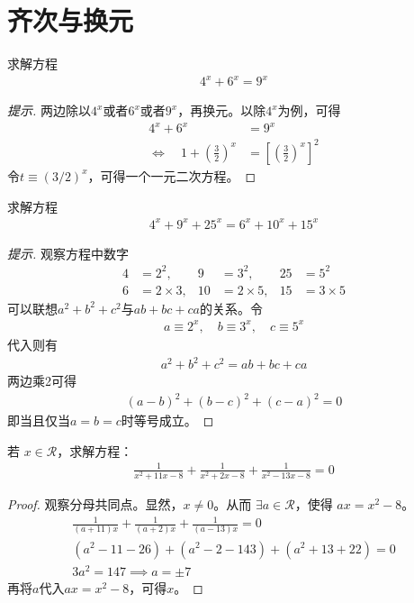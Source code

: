 \section{齐次与换元}
\label{sec:homogeneous-and-substitution}

\begin{example}[美国竞赛题]
  求解方程
  \begin{align*}
    4^x + 6^x = 9^x
  \end{align*}
\end{example}
\begin{proof}[提示]
  两边除以$4^x$或者$6^x$或者$9^x$，再换元。以除$4^x$为例，可得
  \begin{align*}
                               4^x + 6^x &= 9^x\\
    \iff\quad 1 + \left(\frac32\right)^x &= \left[\left(\frac32\right)^x\right]^2
  \end{align*}
  令$t\equiv (3/2)^x$，可得一个一元二次方程。
\end{proof}


\begin{example}[安徽竞赛题]
  求解方程
  \begin{align*}
    4^x + 9^x + 25^x = 6^x + 10^x + 15^x
  \end{align*}
\end{example}
\begin{proof}[提示]
  观察方程中数字
  \begin{align*}
    4 &= 2^2,       & 9 &= 3^2,        & 25 &= 5^2\\
    6 &= 2\times 3, & 10&= 2\times  5, & 15 &= 3\times 5
  \end{align*}
  可以联想$a^2+b^2+c^2$与$ab+bc+ca$的关系。令
  \begin{align*}
    a\equiv 2^x, \quad b\equiv 3^x, \quad c\equiv 5^x
  \end{align*}
  代入则有
  \begin{align*}
    a^2 + b^2 + c^2 = ab + bc + ca
  \end{align*}
  两边乘2可得
  \begin{align*}
    (a-b)^2 + (b-c)^2 + (c-a)^2 = 0
  \end{align*}
  即当且仅当$a=b=c$时等号成立。
\end{proof}



\begin{example}
  若 $x\in\mathcal{R}$，求解方程：
  \begin{align*}
    \frac1{x^2+11x-8} + \frac1{x^2+2x-8} + \frac1{x^2-13x-8} = 0
  \end{align*}
\end{example}
\begin{proof}
  观察分母共同点。显然，$x\ne 0$。从而 $\exists a\in\mathcal{R}$，使得 $ax = x^2-8$。
  \begin{align*}
    \frac1{(a+11)x} + \frac1{(a+2)x} + \frac1{(a-13)x} = 0\\
    (a^2-11-26)+(a^2-2-143)+(a^2+13+22)=0\\
    3a^2=147\implies a=\pm7
  \end{align*}
  再将$a$代入$ax=x^2-8$，可得$x$。
\end{proof}



